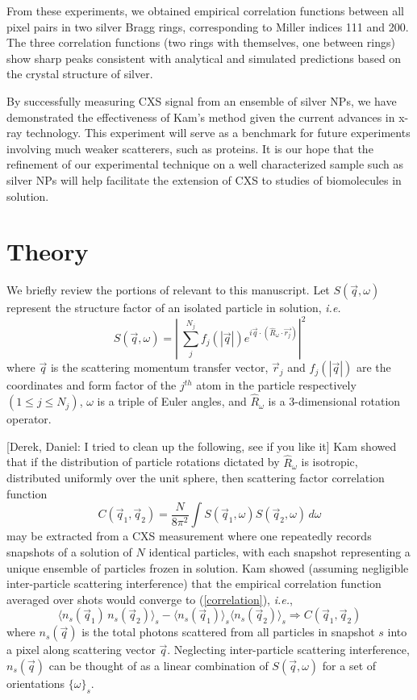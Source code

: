 \documentclass [11pt,fleqn]{article}
\def \be {\begin{equation}}
\def \ee {\end{equation}}
\begin{document}
From these experiments, we obtained empirical correlation functions between all pixel pairs in two silver Bragg rings, corresponding to Miller indices 111 and 200. The three correlation functions (two rings with themselves, one between rings) show sharp peaks consistent with analytical and simulated predictions based on the crystal structure of silver.

By successfully measuring CXS signal from an ensemble of silver NPs, we have demonstrated the effectiveness of Kam's method given the current advances in x-ray technology. This experiment will serve as a benchmark for future experiments involving much weaker scatterers, such as proteins. It is our hope that the refinement of our experimental technique on a well characterized sample such as silver NPs will help facilitate the extension of CXS to studies of biomolecules in solution.

\section{Theory}

We briefly review the portions of \cite{Kam:1977wc} relevant to this manuscript. Let $S( \vec{q},\omega)$ represent the structure factor of an isolated particle in solution, \textit{i.e.}
\be \label{structurefactor}
S(\vec{q},\omega) = \left| \> \sum_{j}^{N_j} f_j (|\vec{q}| )e^{i \vec{q} \cdot  \left( \hat{R}_\omega \cdot \vec{r_j}\right)  } \right| ^{2}
\ee
where $\vec{q}$ is the scattering momentum transfer vector,  $\vec{r}_{j}$ and $f_j (|\vec{q}| )$ are the coordinates and form factor of the $j^{th}$ atom in the particle respectively $( 1 \leq j \leq N_{j} )$, $\omega$ is a triple of Euler angles, and $\hat{R}_\omega$ is a 3-dimensional rotation operator.

[Derek, Daniel: I tried to clean up the following, see if you like it] Kam showed that if the distribution of particle rotations dictated by $\hat{R}_\omega$ is isotropic, distributed uniformly over the unit sphere, then scattering factor correlation function
\be \label{correlation}
C(\vec{q}_1, \vec{q}_2) = \frac{N}{8 \pi^{2}}\int S( \vec{q}_{1},\omega ) S( \vec{q}_{2},\omega ) \, d \omega
\ee
may be extracted from a CXS measurement where one repeatedly records snapshots of a solution of $N$ identical particles, with each snapshot representing a unique ensemble of particles frozen in solution. Kam showed (assuming negligible inter-particle scattering interference) that the empirical correlation function averaged over shots would converge to (\ref{correlation}), \textit{i.e.},
\be \label{converge}
\langle n_{s}(\vec{q}_1) \, n_{s}(\vec{q}_2) \rangle_{s} - \langle n_{s}(\vec{q}_1) \rangle_{s} \langle  n_{s}(\vec{q}_2) \rangle_{s}  \Rightarrow C(\vec{q}_1, \vec{q}_2) 
\ee
where $n_{s}(\vec{q})$ is the total photons scattered from all particles in snapshot $s$ into a pixel along scattering vector $\vec{q}$. Neglecting inter-particle scattering interference, $n_{s}(\vec{q})$ can be thought of as a linear combination of $S(\vec{q},\omega)$ for a set of orientations $\{ \omega\}_{s}$.
\end{document}
